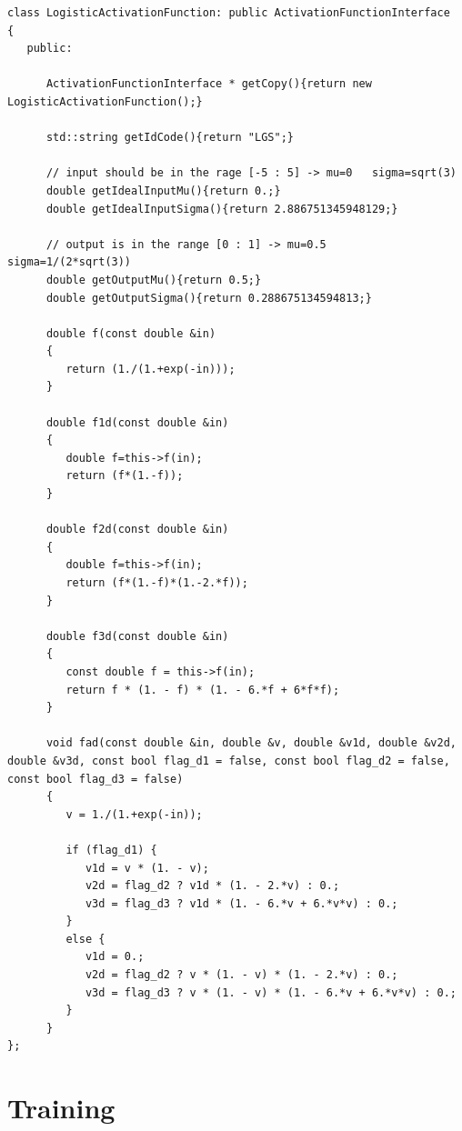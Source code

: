 \documentclass[11pt,a4paper,twoside]{article}
\begin{document}
\begin{lstlisting}
class LogisticActivationFunction: public ActivationFunctionInterface
{
   public:

      ActivationFunctionInterface * getCopy(){return new LogisticActivationFunction();}
      
      std::string getIdCode(){return "LGS";}

      // input should be in the rage [-5 : 5] -> mu=0   sigma=sqrt(3)
      double getIdealInputMu(){return 0.;}
      double getIdealInputSigma(){return 2.886751345948129;}

      // output is in the range [0 : 1] -> mu=0.5   sigma=1/(2*sqrt(3))
      double getOutputMu(){return 0.5;}
      double getOutputSigma(){return 0.288675134594813;}

      double f(const double &in)
      {
         return (1./(1.+exp(-in)));
      }

      double f1d(const double &in)
      {
         double f=this->f(in);
         return (f*(1.-f));
      }

      double f2d(const double &in)
      {
         double f=this->f(in);
         return (f*(1.-f)*(1.-2.*f));
      }

      double f3d(const double &in)
      {
         const double f = this->f(in);
         return f * (1. - f) * (1. - 6.*f + 6*f*f);
      }

      void fad(const double &in, double &v, double &v1d, double &v2d, double &v3d, const bool flag_d1 = false, const bool flag_d2 = false, const bool flag_d3 = false)
      {
         v = 1./(1.+exp(-in));

         if (flag_d1) {
            v1d = v * (1. - v);
            v2d = flag_d2 ? v1d * (1. - 2.*v) : 0.;
            v3d = flag_d3 ? v1d * (1. - 6.*v + 6.*v*v) : 0.;
         }
         else {
            v1d = 0.;
            v2d = flag_d2 ? v * (1. - v) * (1. - 2.*v) : 0.;
            v3d = flag_d3 ? v * (1. - v) * (1. - 6.*v + 6.*v*v) : 0.;
         }
      }
};

\end{lstlisting}


\section{Training} %
\label{sec:training}
\end{document}

